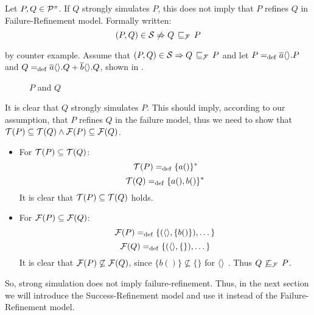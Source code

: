 \begin{rem}
\label{cor_sim_failure_refinement}
Let $P,Q\in\mathcal P^{\pi}$. If $Q$ strongly simulates $P$, this does not imply that $P$ refines $Q$ in Failure-Refinement model. Formally written:
    \[(P,Q)\in{}\simu  \not\Rightarrow Q \refiF P\]
\end{rem}%
\begin{prf}
by counter example. Assume that $(P,Q)\in{}\simu \Rightarrow Q \refiF P$ and let $P=_{\mathrm{def}}\overline{a}\langle\rangle.P$ and $Q=_{\mathrm{def}}\overline{a}\langle\rangle.Q + \overline{b}\langle\rangle.Q$, shown in .
\begin{figure}[H]%
\centering
{}%
\qquad
{}%
\caption{$P$ and $Q$}
\label{vm_and_vmHalf}
\end{figure}

It is clear that $Q$ strongly simulates $P$. This should imply, according to our assumption, that $P$ refines $Q$ in the failure model, thus we need to show that $\Traces[P]\subseteq\Traces[Q] \wedge \Failures[P]\subseteq\Failures[Q]$.
\begin{itemize}
\item For $\Traces[P]\subseteq\Traces[Q]$:
    \[\Traces[P] \define \{a()\}^\ast\]
    \[\Traces[Q] \define \{a(),b()\}^\ast\]
It is clear that $\Traces[P]\subseteq\Traces[Q]$ holds. 
\item For $\Failures[P]\subseteq\Failures[Q]$:
    \[\Failures[P] \define \{(\out{}{},\{b()\}),\dots\}\]
    \[\Failures[Q] \define \{(\out{}{},\{\}),\dots\}\]
It is clear that $\Failures[P]\not\subseteq\Failures[Q]$, since $\{b()\} \not\subseteq \{\}$ for $\overline{}\langle\rangle$ . Thus $Q \not\refiF P$.
\end{itemize}
So, strong simulation does not imply failure-refinement. Thus, in the next section we will introduce the Success-Refinement model and use it instead of the Failure-Refinement model.
\end{prf}